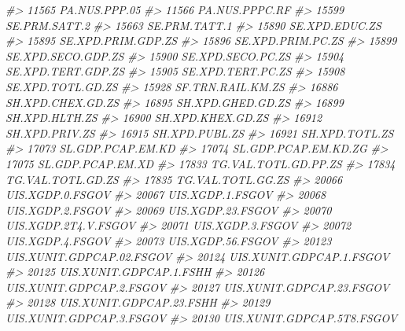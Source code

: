 \documentclass[
]{bxjsbook}
\newenvironment{Shaded}{\begin{snugshade}}{\end{snugshade}}
\newcommand{\CommentTok}[1]{\textcolor[rgb]{0.56,0.35,0.01}{\textit{#1}}}
\theoremstyle{definition}
\theoremstyle{definition}
\theoremstyle{definition}
\theoremstyle{definition}
\theoremstyle{remark}
\begin{document}
\begin{Shaded}
\begin{Highlighting}[]
\CommentTok{\#\textgreater{} 11565              PA.NUS.PPP.05}
\CommentTok{\#\textgreater{} 11566             PA.NUS.PPPC.RF}
\CommentTok{\#\textgreater{} 15599              SE.PRM.SATT.2}
\CommentTok{\#\textgreater{} 15663              SE.PRM.TATT.1}
\CommentTok{\#\textgreater{} 15890             SE.XPD.EDUC.ZS}
\CommentTok{\#\textgreater{} 15895         SE.XPD.PRIM.GDP.ZS}
\CommentTok{\#\textgreater{} 15896          SE.XPD.PRIM.PC.ZS}
\CommentTok{\#\textgreater{} 15899         SE.XPD.SECO.GDP.ZS}
\CommentTok{\#\textgreater{} 15900          SE.XPD.SECO.PC.ZS}
\CommentTok{\#\textgreater{} 15904         SE.XPD.TERT.GDP.ZS}
\CommentTok{\#\textgreater{} 15905          SE.XPD.TERT.PC.ZS}
\CommentTok{\#\textgreater{} 15908          SE.XPD.TOTL.GD.ZS}
\CommentTok{\#\textgreater{} 15928          SF.TRN.RAIL.KM.ZS}
\CommentTok{\#\textgreater{} 16886          SH.XPD.CHEX.GD.ZS}
\CommentTok{\#\textgreater{} 16895          SH.XPD.GHED.GD.ZS}
\CommentTok{\#\textgreater{} 16899             SH.XPD.HLTH.ZS}
\CommentTok{\#\textgreater{} 16900          SH.XPD.KHEX.GD.ZS}
\CommentTok{\#\textgreater{} 16912             SH.XPD.PRIV.ZS}
\CommentTok{\#\textgreater{} 16915             SH.XPD.PUBL.ZS}
\CommentTok{\#\textgreater{} 16921             SH.XPD.TOTL.ZS}
\CommentTok{\#\textgreater{} 17073          SL.GDP.PCAP.EM.KD}
\CommentTok{\#\textgreater{} 17074       SL.GDP.PCAP.EM.KD.ZG}
\CommentTok{\#\textgreater{} 17075          SL.GDP.PCAP.EM.XD}
\CommentTok{\#\textgreater{} 17833       TG.VAL.TOTL.GD.PP.ZS}
\CommentTok{\#\textgreater{} 17834          TG.VAL.TOTL.GD.ZS}
\CommentTok{\#\textgreater{} 17835          TG.VAL.TOTL.GG.ZS}
\CommentTok{\#\textgreater{} 20066           UIS.XGDP.0.FSGOV}
\CommentTok{\#\textgreater{} 20067           UIS.XGDP.1.FSGOV}
\CommentTok{\#\textgreater{} 20068           UIS.XGDP.2.FSGOV}
\CommentTok{\#\textgreater{} 20069          UIS.XGDP.23.FSGOV}
\CommentTok{\#\textgreater{} 20070       UIS.XGDP.2T4.V.FSGOV}
\CommentTok{\#\textgreater{} 20071           UIS.XGDP.3.FSGOV}
\CommentTok{\#\textgreater{} 20072           UIS.XGDP.4.FSGOV}
\CommentTok{\#\textgreater{} 20073          UIS.XGDP.56.FSGOV}
\CommentTok{\#\textgreater{} 20123  UIS.XUNIT.GDPCAP.02.FSGOV}
\CommentTok{\#\textgreater{} 20124   UIS.XUNIT.GDPCAP.1.FSGOV}
\CommentTok{\#\textgreater{} 20125    UIS.XUNIT.GDPCAP.1.FSHH}
\CommentTok{\#\textgreater{} 20126   UIS.XUNIT.GDPCAP.2.FSGOV}
\CommentTok{\#\textgreater{} 20127  UIS.XUNIT.GDPCAP.23.FSGOV}
\CommentTok{\#\textgreater{} 20128   UIS.XUNIT.GDPCAP.23.FSHH}
\CommentTok{\#\textgreater{} 20129   UIS.XUNIT.GDPCAP.3.FSGOV}
\CommentTok{\#\textgreater{} 20130 UIS.XUNIT.GDPCAP.5T8.FSGOV}

\end{Highlighting}
\end{Shaded}
\end{document}

